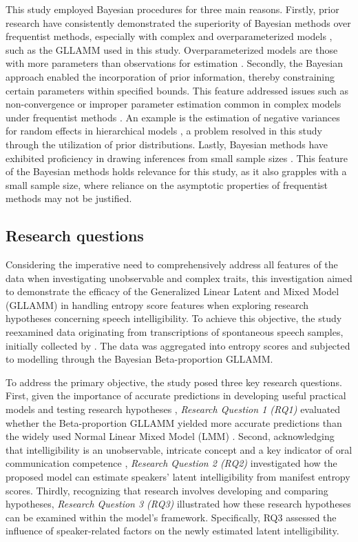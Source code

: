 \documentclass[
  authoryear,
  preprint,
  1p]{elsarticle}
\begin{document}
This study employed Bayesian procedures for three main reasons. Firstly,
prior research have consistently demonstrated the superiority of
Bayesian methods over frequentist methods, especially with complex and
overparameterized models \citep{Baker_1998, Kim_et_al_1999}, such as the
GLLAMM used in this study. Overparameterized models are those with more
parameters than observations for estimation \citep{Everitt_et_al_2010}.
Secondly, the Bayesian approach enabled the incorporation of prior
information, thereby constraining certain parameters within specified
bounds. This feature addressed issues such as non-convergence or
improper parameter estimation common in complex models under frequentist
methods \citep{Martin_et_al_1975, Seaman_et_al_2011}. An example is the
estimation of negative variances for random effects in hierarchical
models \citep{Holmes_et_al_2019}, a problem resolved in this study
through the utilization of prior distributions. Lastly, Bayesian methods
have exhibited proficiency in drawing inferences from small sample sizes
\citep{Baldwin_et_al_2013, Lambert_et_al_2005, Depaoli_2014}. This
feature of the Bayesian methods holds relevance for this study, as it
also grapples with a small sample size, where reliance on the asymptotic
properties of frequentist methods may not be justified.

\subsection{Research questions}\label{sec-I-RQ}

Considering the imperative need to comprehensively address all features
of the data when investigating unobservable and complex traits, this
investigation aimed to demonstrate the efficacy of the Generalized
Linear Latent and Mixed Model (GLLAMM) in handling entropy score
features when exploring research hypotheses concerning speech
intelligibility. To achieve this objective, the study reexamined data
originating from transcriptions of spontaneous speech samples, initially
collected by \citet{Boonen_et_al_2023}. The data was aggregated into
entropy scores and subjected to modelling through the Bayesian
Beta-proportion GLLAMM.

To address the primary objective, the study posed three key research
questions. First, given the importance of accurate predictions in
developing useful practical models and testing research hypotheses
\citep{Shmueli_et_al_2012}, \emph{Research Question 1 (RQ1)} evaluated
whether the Beta-proportion GLLAMM yielded more accurate predictions
than the widely used Normal Linear Mixed Model (LMM)
\citep{Holmes_et_al_2019}. Second, acknowledging that intelligibility is
an unobservable, intricate concept and a key indicator of oral
communication competence \citep{Kent_et_al_1994}, \emph{Research
Question 2 (RQ2)} investigated how the proposed model can estimate
speakers' latent intelligibility from manifest entropy scores. Thirdly,
recognizing that research involves developing and comparing hypotheses,
\emph{Research Question 3 (RQ3)} illustrated how these research
hypotheses can be examined within the model's framework. Specifically,
RQ3 assessed the influence of speaker-related factors on the newly
estimated latent intelligibility.
\end{document}
